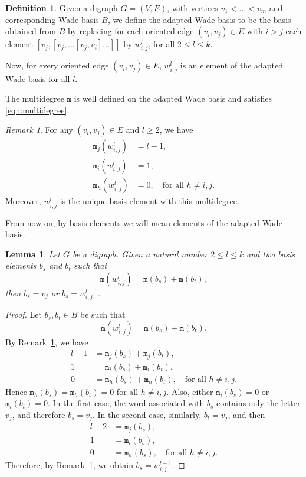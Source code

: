 \documentclass[a4paper,11pt]{amsart}
\newtheorem{lemma}[theorem]{Lemma}
\theoremstyle{definition}
\newtheorem{definition}[theorem]{Definition}
\theoremstyle{remark}
\newtheorem{remark}[theorem]{Remark}
\numberwithin{equation}{section}
\newcommand{\mult}{\mathtt{m}}
\begin{document}
\begin{definition}\label{def:wade-adapted}
  Given a digraph $G=(V,E)$, with vertices $v_1<\dots <v_m$ and corresponding Wade basis $B$,
  we define the adapted Wade basis to be the basis obtained from $B$ by replacing for each 
  oriented edge $(v_i,v_j)\in E$ with $i>j$ each element $[v_j,[v_j,\dots[v_j,v_i]\dots]]$ by $w_{i,j}^l$, for all $2\leq l\leq k$.
\end{definition}

Now, for every oriented edge $(v_i,v_j)\in E$, $w_{i,j}^l$ is an element of the adapted Wade basis for all $l$. 

\medskip

The multidegree $\mult$ is well defined on the adapted Wade basis and satisfies \eqref{eqn:multidegree}.

\begin{remark}\label{rmk:1}
For any $(v_i,v_j)\in E$ and $l\geq 2$, we have
\begin{align*}
\mult_j(w_{i,j}^l)&=l-1,\\
\mult_i(w_{i,j}^l)&=1,\\
\mult_h(w_{i,j}^l)&=0, \quad \text{for all } h\neq i,j.
\end{align*}
Moreover, $w_{i,j}^l$ is the unique basis element with this multidegree.
\end{remark}

From now on, by basis elements we will mean elements of the adapted Wade basis.


\begin{lemma}\label{lemma:1}
Let $G$ be a digraph. Given a natural number $2\leq l\leq k$ and two basis elements $b_s$ and $b_t$ such that
\[
\mult(w_{i,j}^l)=\mult(b_s)+\mult(b_t),
\]
then $b_s=v_j$ or $b_s=w_{i,j}^{l-1}$.
\end{lemma}

\begin{proof}
Let $b_s,b_t\in B$ be such that
\[
\mult(w_{i,j}^l)=\mult(b_s)+\mult(b_t).
\]
By Remark~\ref{rmk:1}, we have
\begin{align*}
l-1&=\mult_j(b_s)+\mult_j(b_t),\\
1&=\mult_i(b_s)+\mult_i(b_t),\\
0&=\mult_h(b_s)+\mult_h(b_t), \quad \text{for all } h\neq i,j.
\end{align*}
Hence $\mult_h(b_s)=\mult_h(b_t)=0$ for all $h\neq i,j$. Also, either $\mult_i(b_s)=0$ or $\mult_i(b_t)=0$. In the first case, the word associated with $b_s$ contains only the letter $v_j$, and therefore $b_s=v_j$. In the second case, similarly, $b_t=v_j$, and then
\begin{align*}
l-2&=\mult_j(b_s),\\
1&=\mult_i(b_s),\\
0&=\mult_h(b_s), \quad \text{for all } h\neq i,j.
\end{align*}
Therefore, by Remark~\ref{rmk:1}, we obtain $b_s=w_{i,j}^{l-1}$.
\end{proof}
\end{document}
